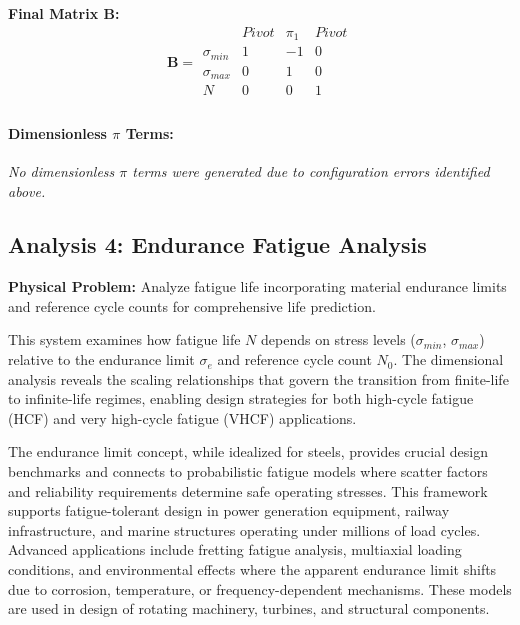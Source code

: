         \textbf{Final Matrix $\mathbf{B}$:}
        \[\mathbf{B} = \begin{array}{r|rrr}
        & Pivot & \pi_{1} & Pivot \\
        \hline
        \sigma_{min} & 1 & -1 & 0 \\
\sigma_{max} & 0 & 1 & 0 \\
N & 0 & 0 & 1 \\

        \end{array}\]

        \paragraph{Dimensionless $\pi$ Terms: }
        \textit{No dimensionless $\pi$ terms were generated due to configuration errors identified above.}


\subsection{Analysis 4: Endurance Fatigue Analysis}
\label{sec:Endurance_Fatigue_Analysis}

\begin{problembox}
\textbf{Physical Problem:} Analyze fatigue life incorporating material endurance limits and reference cycle counts for comprehensive life prediction.
\end{problembox}

This system examines how fatigue life $N$ depends on stress levels ($\sigma_{min}$, $\sigma_{max}$) relative to the endurance limit $\sigma_e$ and reference cycle count $N_0$. The dimensional analysis reveals the scaling relationships that govern the transition from finite-life to infinite-life regimes, enabling design strategies for both high-cycle fatigue (HCF) and very high-cycle fatigue (VHCF) applications.



The endurance limit concept, while idealized for steels, provides crucial design benchmarks and connects to probabilistic fatigue models where scatter factors and reliability requirements determine safe operating stresses. This framework supports fatigue-tolerant design in power generation equipment, railway infrastructure, and marine structures operating under millions of load cycles. Advanced applications include fretting fatigue analysis, multiaxial loading conditions, and environmental effects where the apparent endurance limit shifts due to corrosion, temperature, or frequency-dependent mechanisms.  These models are used in design of rotating machinery, turbines, and structural components.

